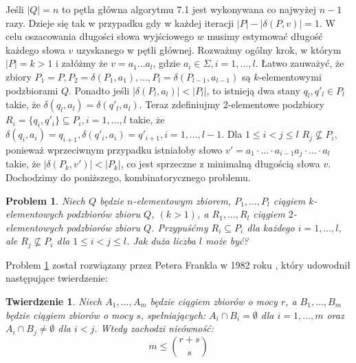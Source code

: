 \documentclass[12pt,a4paper]{article}
\newtheorem{twr}{Twierdzenie}[section]
\newtheorem{pro}{Problem}[section]
\begin{document}
 
Je\'sli $|Q|=n$ to p\k{e}tla g{\l}\'owna algorytmu 7.1 jest wykonywana co najwy\.zej $n-1$ razy. Dzieje si\k{e} tak w  przypadku gdy w każdej iteracji $|P|-|\delta(P,v)|=1$. W celu oszacowania d{\l}ugo\'sci s{\l}owa wyj\'sciowego $w$ musimy estymowa\'c d{\l}ugo\'s\'c ka\.zdego s{\l}owa $v$ uzyskanego w  p\k{e}tli g{\l}\'ownej. 
Rozwa\.zmy og\'olny krok, w kt\'orym $|P|=k>1$ i za{\l}\'o\.zmy \.ze $v=a_{1}\ldots a_{l}$, gdzie $a_{i}\in \Sigma, i=1,\ldots, l$. {\L}atwo zauwa\.zy\'c, \.ze zbiory $P_{1}=P, P_{2}=\delta(P_{1},a_{1}),\ldots, P_{l}=\delta(P_{l-1},a_{l-1})$ s\k{a} $k$-elementowymi podzbiorami $Q$. Ponadto je\'sli $|\delta(P_{l},a_{l})|<|P_{l}|$, to istniej\k{a} dwa stany $q_{l},q'_{l}\in P_{l}$ takie, \.ze $\delta(q_{l},a_{l})=\delta(q'_{l},a_{l})$. Teraz zdefiniujmy  $2$-elementowe podzbiory $R_{i}=\{q_{i},q'_{i}\}\subseteq P_{i}, i=1,\ldots,l$ takie, \.ze $\delta(q_{i},a_{i})=q_{i+1}, \delta(q'_{i},a_{i})=q'_{i+1}, i=1,\ldots,l-1$. Dla $1\leq i<j\leq l$ $R_{j}\not\subseteq P_{i}$, poniewa\.z wprzeciwnym przypadku istnia{\l}oby s{\l}owo $v'=a_{1}\cdot\ldots\cdot a_{i-1}a_{j}\cdot\ldots\cdot a_{l}$ takie, \.ze $|\delta(P_{k},v')|<|P_{k}|$, co jest sprzeczne z  minimaln\k{a} d{\l}ugo\'sci\k{a} s{\l}owa $v$. Dochodzimy do poni\.zszego, kombinatorycznego problemu.
\begin{pro}
\label{problem3}
Niech $Q$ b\k{e}dzie $n$-elementowym zbiorem, $P_{1},\ldots,P_{l}$ ci\k{a}giem $k$-elementowych podzbior\'ow zbioru $Q$, $(k>1)$, a $R_{1},\ldots,R_{l}$ ci\k{a}giem $2$-elementowych podzbior\'ow zbioru $Q$. Przypu\'s\'cmy $R_{i}\subseteq P_{i}$ dla ka\.zdego $i=1,\ldots,l$, ale $R_{j}\not\subseteq P_{i}$ dla $1\leq i<j\leq l$. Jak du\.za liczba $l$ mo\.ze by\'c?
\end{pro}

Problem \ref{problem3} zosta{\l} rozwi\k{a}zany przez Petera Frankla w 1982 roku \cite{1}, kt\'ory udowodni{\l} nast\k{e}puj\k{a}ce twierdzenie: 
\begin{twr} 
Niech $A_{1},\ldots,A_{m}$ b\k{e}dzie ci\k{a}giem zbior\'ow o mocy $r$, a $B_{1},\ldots,B_{m}$ b\k{e}dzie ci\k{a}giem zbior\'ow o mocy $s$, spe{\l}niaj\k{a}cych: $A_{i}\cap B_{i}=\emptyset$ dla $i=1,\ldots,m$ oraz $A_{i}\cap B_{j}\neq\emptyset$ dla $i<j$. Wtedy zachodzi nie\'owno\'s\'c:
\begin{equation} 
m\leq{{r+s}\choose{s}}
\end{equation}
\end{twr} 
\end{document}
